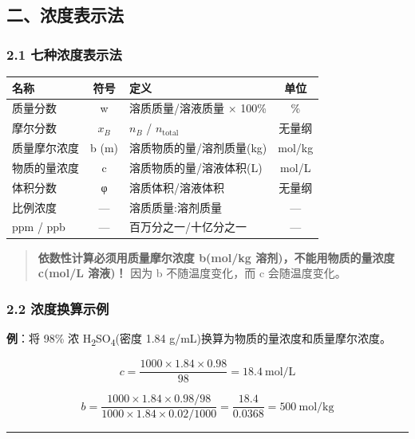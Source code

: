\documentclass[a4paper,11pt]{ctexart}
\newcounter{none}
\newcommand{\箭}{\ensuremath{\rightarrow}}
\newcommand{\左箭}{\ensuremath{\leftarrow}}
\newcommand{\上箭}{\ensuremath{\uparrow}}
\newcommand{\下箭}{\ensuremath{\downarrow}}
\newcommand{\衡}{\ensuremath{\rightleftharpoons}}
\newcommand{\双箭}{\ensuremath{\leftrightarrow}}
\newcommand{\约等于}{\ensuremath{\approx}}
\newcommand{\小于等于}{\ensuremath{\leq}}
\newcommand{\大于等于}{\ensuremath{\geq}}
\newcommand{\不等于}{\ensuremath{\neq}}
\newcommand{\西格马}{\ensuremath{\sigma}}
\newcommand{\派}{\ensuremath{\pi}}
\begin{document}
\subsection{二、浓度表示法}\label{ux4e8cux6d53ux5ea6ux8868ux793aux6cd5}

\subsubsection{2.1 七种浓度表示法}\label{ux4e03ux79cdux6d53ux5ea6ux8868ux793aux6cd5}

{\def\LTcaptype{none} %
\begin{longtable}[]{@{}lclc@{}}
\toprule\noalign{}
名称 & 符号 & 定义 & 单位 \\
\midrule\noalign{}
\endhead
\bottomrule\noalign{}
\endlastfoot
质量分数 & w & 溶质质量/溶液质量 × 100\% & \% \\
摩尔分数 & \(x_B\) & \(n_B\) / \(n_{\text{total}}\) & 无量纲 \\
质量摩尔浓度 & b (m) & 溶质物质的量/溶剂质量(kg) & mol/kg \\
物质的量浓度 & c & 溶质物质的量/溶液体积(L) & mol/L \\
体积分数 & φ & 溶质体积/溶液体积 & 无量纲 \\
比例浓度 & --- & 溶质质量:溶剂质量 & --- \\
ppm / ppb & --- & 百万分之一/十亿分之一 & --- \\
\end{longtable}
}

\begin{quote}
\textbf{依数性计算必须用质量摩尔浓度 b(mol/kg 溶剂)，不能用物质的量浓度 c(mol/L 溶液)！} 因为 b 不随温度变化，而 c 会随温度变化。
\end{quote}

\subsubsection{2.2 浓度换算示例}\label{ux6d53ux5ea6ux6362ux7b97ux793aux4f8b}

\textbf{例}：将 98\% 浓 H\textsubscript{2}SO\textsubscript{4}(密度 1.84 g/mL)换算为物质的量浓度和质量摩尔浓度。

\[
c = \frac{1000 \times 1.84 \times 0.98}{98} = 18.4\ \mathrm{mol/L}
\]

\[
b = \frac{1000 \times 1.84 \times 0.98 / 98}{1000 \times 1.84 \times 0.02 / 1000} = \frac{18.4}{0.0368} = 500\ \mathrm{mol/kg}
\]

\begin{center}\rule{0.5\linewidth}{0.5pt}\end{center}
\end{document}
